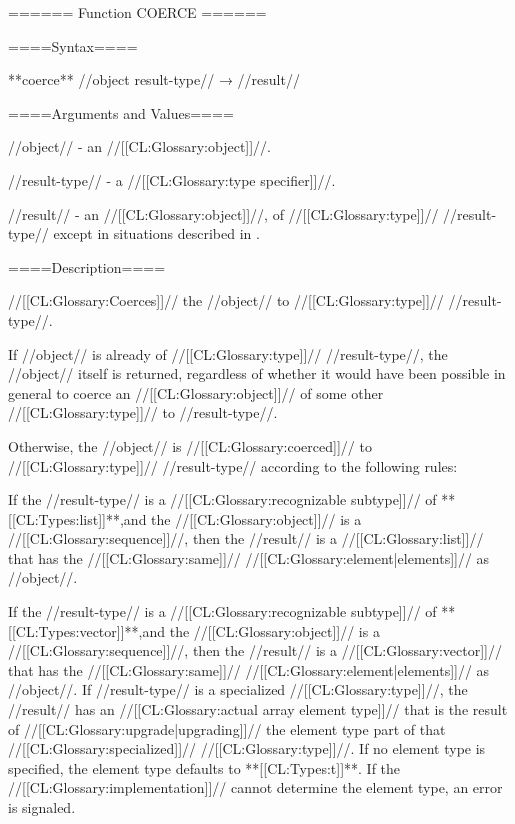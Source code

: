 ====== Function COERCE ======

====Syntax====

**coerce** //object result-type// → //result//

====Arguments and Values====

//object// - an //[[CL:Glossary:object]]//.

//result-type// - a //[[CL:Glossary:type specifier]]//.

//result// - an //[[CL:Glossary:object]]//, of //[[CL:Glossary:type]]// //result-type// except in situations described in \secref\RuleOfCanonRepForComplexRationals.

====Description====

//[[CL:Glossary:Coerces]]// the //object// to //[[CL:Glossary:type]]// //result-type//.

If //object// is already of //[[CL:Glossary:type]]// //result-type//, the //object// itself is returned, regardless of whether it would have been possible in general to coerce an //[[CL:Glossary:object]]// of some other //[[CL:Glossary:type]]// to //result-type//.

Otherwise, the //object// is //[[CL:Glossary:coerced]]// to //[[CL:Glossary:type]]// //result-type// according to the following rules:

\beginlist


If the //result-type// is a //[[CL:Glossary:recognizable subtype]]// of **[[CL:Types:list]]**,and the //[[CL:Glossary:object]]// is a //[[CL:Glossary:sequence]]//, then the //result// is a //[[CL:Glossary:list]]// that has the //[[CL:Glossary:same]]// //[[CL:Glossary:element|elements]]// as //object//.

If the //result-type// is a //[[CL:Glossary:recognizable subtype]]// of **[[CL:Types:vector]]**,and the //[[CL:Glossary:object]]// is a //[[CL:Glossary:sequence]]//, then the //result// is a //[[CL:Glossary:vector]]// that has the //[[CL:Glossary:same]]// //[[CL:Glossary:element|elements]]// as //object//. If //result-type// is a specialized //[[CL:Glossary:type]]//, the //result// has an //[[CL:Glossary:actual array element type]]// that is the result of //[[CL:Glossary:upgrade|upgrading]]// the element type part of that //[[CL:Glossary:specialized]]// //[[CL:Glossary:type]]//. If no element type is specified, the element type defaults to **[[CL:Types:t]]**. If the //[[CL:Glossary:implementation]]// cannot determine the element type, an error is signaled.

